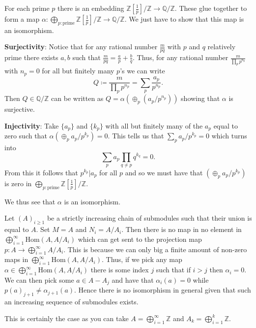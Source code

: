 \documentclass[a4paper]{article}
\begin{document}
\begin{exercise}{6}
  For each prime $ p $ there is an embedding $ \mathbb{Z} [\frac{1}{p}]  / \mathbb{Z} \to \mathbb{Q}/\mathbb{Z} $. These glue together to form a map $ \alpha: \bigoplus_{p:\text{prime}} \mathbb{Z}  [\frac{1}{p}] / \mathbb{Z} \to \mathbb{Q}/\mathbb{Z} $. We just have to show that this map is an isomorphism.

  \textbf{Surjectivity}: Notice that for any rational number $ \frac{m}{pq} $ with $ p $ and $ q $ relatively prime there exists $ a,b $ such that $ \frac{m}{pq} = \frac{a}{p} + \frac{b}{q} $. Thus, for any rational number $ \frac{m}{\prod_{p} p^{n_p}} $ with $ n_p = 0 $ for all but finitely many $ p $'s we can write
  \begin{equation*}
   Q \coloneqq \frac{m}{\prod_{p} p^{n_p}} = \sum_{p} \frac{a_p}{p^{n_p}}
  .\end{equation*}
  Then $ Q \in \mathbb{Q}/\mathbb{Z} $ can be written as $ Q = \alpha\left(\oplus_{p}(a_p/p^{n_p})\right) $ showing that $ \alpha $ is surjective.

  \textbf{Injectivity}: Take $ \{a_p\} $ and $ \{k_p\} $ with all but finitely many of the $ a_p $ equal to zero such that $ \alpha \left( \oplus_{p} a_{p}/p^{k_p} \right) = 0 $. This tells us that $ \sum_{p} a_{p}/p^{k_p} = 0 $ which turns into
  \begin{equation*}
  \sum_{p} a_p \prod_{q \neq p} q^{k_q} = 0
  .\end{equation*}
  From this it follows that $ p^{k_p} | a_p $ for all $ p $ and so we must have that $ \left( \oplus_{p} a_{p}/p^{k_p} \right) $ is zero in $ \bigoplus_{p:\text{prime}} \mathbb{Z}  [\frac{1}{p}] / \mathbb{Z} $.

  We thus see that $ \alpha $ is an isomorphism.
\end{exercise}

\begin{exercise}{7}
  Let $ (A)_{i \geq 1} $ be a strictly increasing chain of submodules such that their union is equal to $ A $. Set $ M = A $ and $ N_i = A/A_i $. Then there is no map in no element in $ \bigoplus_{i = 1}^{\infty} \text{Hom}(A, A/A_i) $ which can get sent to the projection map $ p: A \to \bigoplus_{i = 1}^{\infty} A/A_i $. This is because we can only big a finite amount of non-zero maps in $ \bigoplus_{i = 1}^{\infty} \text{Hom}(A, A/A_i) $. Thus, if we pick any map $ \alpha \in  \bigoplus_{i = 1}^{\infty} \text{Hom}(A, A/A_i)  $ there is some index $ j $ such that if $ i > j $ then $ \alpha_i = 0 $. We can then pick some $ a \in A - A_j $ and have that $ \alpha_i(a) = 0 $ while $ p(a)_{j+1} \neq \alpha_{j+1}(a) $. Hence there is no isomorphism in general given that such an increasing sequence of submodules exists.

  This is certainly the case as you can take $ A = \bigoplus_{i = 1}^{\infty} \mathbb{Z} $ and $ A_{k} = \bigoplus_{i = 1}^{k} \mathbb{Z} $.
\end{exercise}
\end{document}

